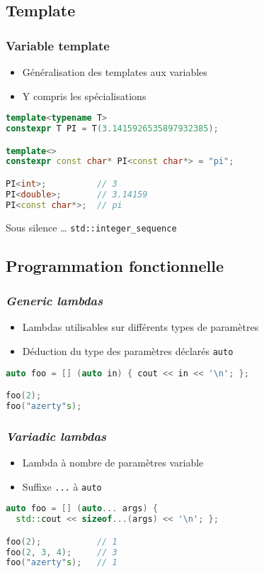 \documentclass[C++.tex]{subfiles}
\begin{document}
\subsection*{Template}
\begin{frame}[fragile]
	\frametitle{Variable template}
	\begin{itemize}
		\item Généralisation des templates aux variables
		\item Y compris les spécialisations
	\end{itemize}

	\begin{lstlisting}[language=C++]
template<typename T>
constexpr T PI = T(3.1415926535897932385);

template<>
constexpr const char* PI<const char*> = "pi";

PI<int>;          // 3
PI<double>;       // 3.14159
PI<const char*>;  // pi\end{lstlisting}

	\begin{block}{Sous silence \ldots}
		\lstinline|std::integer_sequence|
	\end{block}
\end{frame}

\subsection*{Programmation fonctionnelle}
\begin{frame}[fragile]
	\frametitle{\textit{Generic lambdas}}
	\begin{itemize}
		\item Lambdas utilisables sur différents types de paramètres
		\item Déduction du type des paramètres déclarés \lstinline|auto|
	\end{itemize}

	\begin{lstlisting}[language=C++]
auto foo = [] (auto in) { cout << in << '\n'; };

foo(2);
foo("azerty"s);\end{lstlisting}
\end{frame}

\begin{frame}[fragile]
	\frametitle{\textit{Variadic lambdas}}
	\begin{itemize}
		\item Lambda à nombre de paramètres variable
		\item Suffixe \lstinline|...| à \lstinline|auto|
	\end{itemize}

	\begin{lstlisting}[language=C++]
auto foo = [] (auto... args) { 
  std::cout << sizeof...(args) << '\n'; };

foo(2);           // 1
foo(2, 3, 4);     // 3
foo("azerty"s);   // 1\end{lstlisting}
\end{frame}
\end{document}
